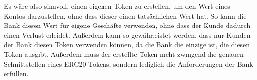 \bigbreak
{}
\label{datenspeicherung:neuer-token}
\noindent
Es wäre also sinnvoll, einen eigenen Token zu erstellen, um den Wert eines Kontos darzustellen, ohne dass dieser einen tatsächlichen Wert hat. So kann die Bank diesen Wert für eigene Geschäfte verwenden, ohne dass der Kunde dadurch einen Verlust erleidet. 
Außerdem kann so gewährleistet werden, dass nur Kunden der Bank diesen Token verwenden können, da die Bank die einzige ist, die diesen Token ausgibt.
Außerdem muss der erstellte Token nicht zwingend die genauen Schnittstellen eines ERC20 Tokens, sondern lediglich die Anforderungen der Bank erfüllen.